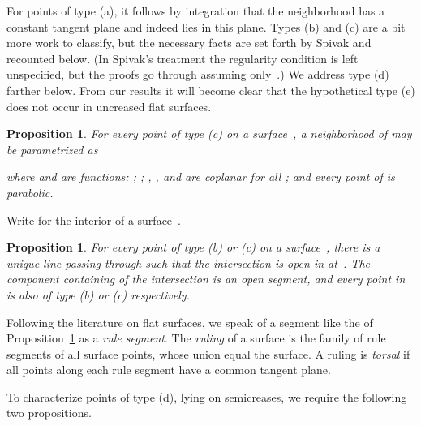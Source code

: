 \documentclass[11pt,letterpaper]{article}
\newtheorem{proposition}[theorem]{Proposition}
\newcommand\term[1]{\emph{#1}}
\begin{document}
For points of type (a), it follows by integration that the
neighborhood has a constant tangent plane and indeed lies in this
plane.  Types (b) and (c) are a bit more work to classify, but the
necessary facts are set forth by
Spivak \cite[vol.~3, chap.~5, pp.~349--362]{Spivak-1979}
and recounted below.
(In Spivak's treatment the regularity condition is left unspecified,
but the proofs go through assuming only~.)
We address type (d) farther below.  From our results it will become clear that
the hypothetical type (e) does not occur in uncreased flat surfaces.

\begin{proposition}
  {\rm \cite[Proposition III.5.4 et seq.]{Spivak-1979}} \label{prp:1}
  For every point  of type (c) on a surface~, a
  neighborhood  of  may be parametrized as
  
  where  and  are  functions; ;
  ; , , and  are coplanar
  for all ; and every point of  is parabolic.
\end{proposition}

Write  for the interior of a surface~.

\begin{proposition}
  {\rm \cite[Corollaries III.5.6--7]{Spivak-1979}} \label{prp:2}
  For every point  of type (b) or (c) on a surface~,
  there is a unique line  passing through  such that
  the intersection  is open in  at~.
  The component  containing  of the
  intersection  is an open segment,
  and every point in  is also of type (b) or (c) respectively.
\end{proposition}

Following the literature on flat surfaces, we speak of a segment like
the  of Proposition~\ref{prp:2} as a \term{rule segment}.
The \term{ruling} of a surface is the family of rule segments of all
surface points, whose union equal the surface.
A ruling is \term{torsal} if all points along each rule segment
have a common tangent plane.

To characterize points of type (d), lying on semicreases, we require
the following two propositions.
\end{document}
